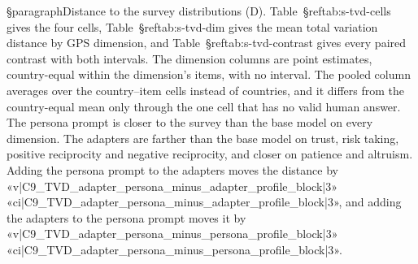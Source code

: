 {§paragraph{Distance to the survey distributions (D).} Table~§ref{tab:s-tvd-cells} gives the four cells, Table~§ref{tab:s-tvd-dim} gives the mean total variation distance by GPS dimension, and Table~§ref{tab:s-tvd-contrast} gives every paired contrast with both intervals. The dimension columns are point estimates, country-equal within the dimension's items, with no interval. The pooled column averages over the country--item cells instead of countries, and it differs from the country-equal mean only through the one cell that has no valid human answer. The persona prompt is closer to the survey than the base model on every dimension. The adapters are farther than the base model on trust, risk taking, positive reciprocity and negative reciprocity, and closer on patience and altruism. Adding the persona prompt to the adapters moves the distance by «v|C9_TVD_adapter_persona_minus_adapter_profile_block|3» «ci|C9_TVD_adapter_persona_minus_adapter_profile_block|3», and adding the adapters to the persona prompt moves it by «v|C9_TVD_adapter_persona_minus_persona_profile_block|3» «ci|C9_TVD_adapter_persona_minus_persona_profile_block|3».

}
